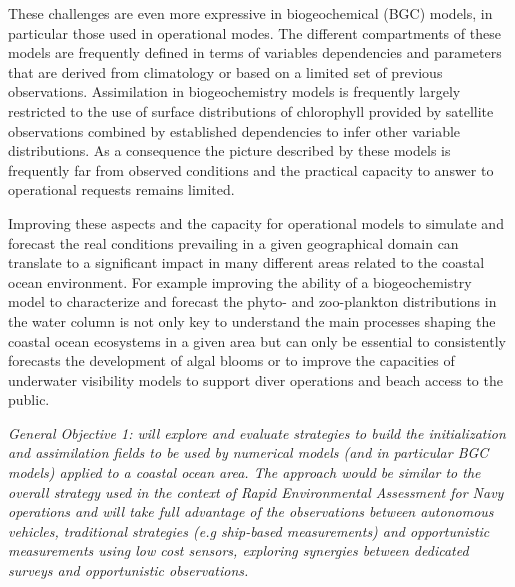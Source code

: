 These challenges are even more expressive in biogeochemical (BGC)
models, in particular those used in operational modes. The different
compartments of these models are frequently defined in terms of
variables dependencies and parameters that are derived from
climatology or based on a limited set of previous
observations. Assimilation in biogeochemistry models is frequently
largely restricted to the use of surface distributions of chlorophyll
provided by satellite observations combined by established
dependencies to infer other variable distributions. As a consequence
the picture described by these models is frequently far from observed
conditions and the practical capacity to answer to operational
requests remains limited.
 
Improving these aspects and the capacity for operational models to
simulate and forecast the real conditions prevailing in a given
geographical domain can translate to a significant impact in many
different areas related to the coastal ocean environment. For example
improving the ability of a biogeochemistry model to characterize and
forecast the phyto- and zoo-plankton distributions in the water column
is not only key to understand the main processes shaping the coastal
ocean ecosystems in a given area but can only be essential to
consistently forecasts the development of algal blooms or to improve
the capacities of underwater visibility models to support diver
operations and beach access to the public. 
 
\emph{General Objective 1: \proj will explore and evaluate strategies
  to build the initialization and assimilation fields to be used by
  numerical models (and in particular BGC models) applied to a coastal
  ocean area. The approach would be similar to the overall strategy
  used in the context of Rapid Environmental Assessment for Navy
  operations and will take full advantage of the observations between
  autonomous vehicles, traditional strategies (e.g ship-based
  measurements) and opportunistic measurements using low cost sensors,
  exploring synergies between dedicated surveys and opportunistic
  observations.}
 
